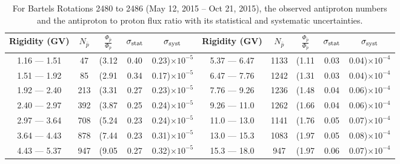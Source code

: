 \begin{table}[p] 
\renewcommand\baselinestretch{1.3}\selectfont
\setlength\tabcolsep{3pt}
\centering
\begin{tabular}{ccccc | ccccc}
\hline
\textbf{Rigidity}  (GV)  & $N_{\bar{p}}$ & $\frac{\Phi_{\bar{p}}}{\Phi_{p}}$ & $\sigma_{\rm{stat}}$ & $\sigma_{\rm{syst}}$ \hspace{1cm}   & \textbf{Rigidity}  (GV)  & $N_{\bar{p}}$ & $\frac{\Phi_{\bar{p}}}{\Phi_{p}}$ & $\sigma_{\rm{stat}}$ & $\sigma_{\rm{syst}}$ \hspace{1cm} \\ 
\hline
1.16 — 1.51   & 47                   &(3.12                          &  0.40              &      0.23)$\times 10^{-5}$  & 5.37 — 6.47                &  1133                    &(1.11                                &  0.03                   &      0.04)$\times 10^{-4}$\\
1.51 — 1.92   & 85                   &(2.91                          &  0.34              &      0.17)$\times 10^{-5}$  & 6.47 — 7.76                &  1242                    &(1.31                                &  0.03                   &      0.04)$\times 10^{-4}$\\
1.92 — 2.40   &  213                &(3.31                          &  0.27              &      0.23)$\times 10^{-5}$  & 7.76 — 9.26                &  1236                   &(1.48                                &  0.04                   &      0.06)$\times 10^{-4}$\\    
2.40 — 2.97   &  392                &(3.87                          &  0.25              &      0.24)$\times 10^{-5}$  & 9.26 — 11.0                &  1262                    &(1.66                                &  0.04                   &      0.06)$\times 10^{-4}$\\    
2.97 — 3.64   &  708                &(5.24                          &  0.23              &      0.24)$\times 10^{-5}$  & 11.0 — 13.0                 &  1141                    &(1.76                                &  0.05                   &      0.07)$\times 10^{-4}$\\
3.64 — 4.43   &  878                &(7.44                          &  0.23              &      0.31)$\times 10^{-5}$  & 13.0 — 15.3               &  1083                    &(1.97                                &  0.05                   &      0.08)$\times 10^{-4}$\\
4.43 — 5.37   &  947                &(9.05                          &  0.27              &      0.32)$\times 10^{-5}$  & 15.3 — 18.0               &  947                      &(1.97                                &  0.06                   &      0.07)$\times 10^{-4}$\\
\hline
\end{tabular}
\caption[Antiproton to proton flux ratio for Bartels Rotations 2480 to 2486]{For Bartels Rotations 2480 to 2486 (May 12, 2015 – Oct 21, 2015), the observed antiproton numbers and the antiproton to proton flux ratio with its statistical and systematic uncertainties.}
\label{TableOfDependent10}
\end{table}

